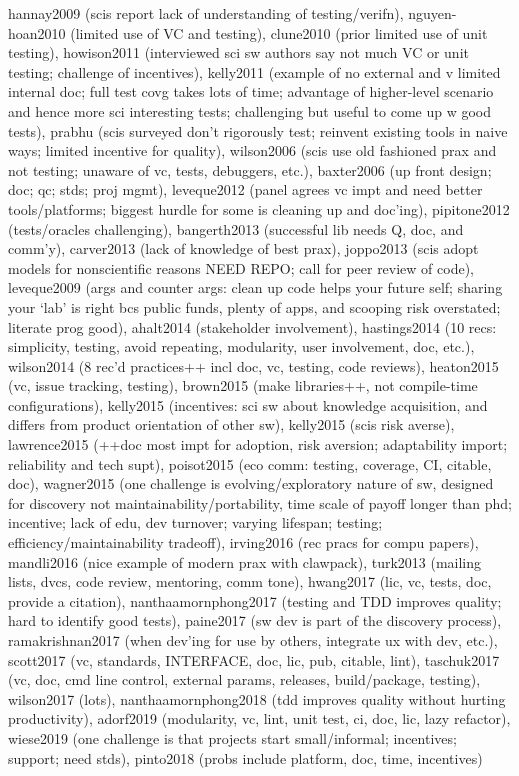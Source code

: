 \documentclass[12pt]{amsart}
\begin{document}
hannay2009 (scis report lack of understanding of testing/verifn), nguyen-hoan2010 (limited use of VC and testing), clune2010 (prior limited use of unit testing), howison2011 (interviewed sci sw authors say not much VC or unit testing; challenge of incentives), kelly2011 (example of no external and v limited internal doc; full test covg takes lots of time; advantage of higher-level scenario and hence more sci interesting tests; challenging but useful to come up w good tests), prabhu (scis surveyed don't rigorously test; reinvent existing tools in naive ways; limited incentive for quality), wilson2006 (scis use old fashioned prax and not testing; unaware of vc, tests, debuggers, etc.), baxter2006 (up front design; doc; qc; stds; proj mgmt), leveque2012 (panel agrees vc impt and need better tools/platforms; biggest hurdle for some is cleaning up and doc'ing), pipitone2012 (tests/oracles challenging), bangerth2013 (successful lib needs Q, doc, and comm'y), carver2013 (lack of knowledge of best prax), joppo2013 (scis adopt models for nonscientific reasons NEED REPO; call for peer review of code), leveque2009 (args and counter args: clean up code helps your future self; sharing your `lab' is right bcs public funds, plenty of apps, and scooping risk overstated; literate prog good), ahalt2014 (stakeholder involvement), hastings2014 (10 recs: simplicity, testing, avoid repeating, modularity, user involvement, doc, etc.), wilson2014 (8 rec'd practices++ incl doc, vc, testing, code reviews), heaton2015 (vc, issue tracking, testing), brown2015 (make libraries++, not compile-time configurations), kelly2015 (incentives: sci sw about knowledge acquisition, and differs from product orientation of other sw), kelly2015 (scis risk averse), lawrence2015 (++doc most impt for adoption, risk aversion; adaptability import; reliability and tech supt), poisot2015 (eco comm: testing, coverage, CI, citable, doc), wagner2015 (one challenge is evolving/exploratory nature of sw, designed for discovery not maintainability/portability, time scale of payoff longer than phd; incentive; lack of edu, dev turnover; varying lifespan; testing; efficiency/maintainability tradeoff), irving2016 (rec pracs for compu papers), mandli2016 (nice example of modern prax with clawpack), turk2013 (mailing lists, dvcs, code review, mentoring, comm tone), hwang2017 (lic, vc, tests, doc, provide a citation), nanthaamornphong2017 (testing and TDD improves quality; hard to identify good tests), paine2017 (sw dev is part of the discovery process), ramakrishnan2017 (when dev'ing for use by others, integrate ux with dev, etc.), scott2017 (vc, standards, INTERFACE, doc, lic, pub, citable, lint), taschuk2017 (vc, doc, cmd line control, external params, releases, build/package, testing), wilson2017 (lots), nanthaamornphong2018 (tdd improves quality without hurting productivity), adorf2019 (modularity, vc, lint, unit test, ci, doc, lic, lazy refactor), wiese2019 (one challenge is that projects start small/informal; incentives; support; need stds), pinto2018 (probs include platform, doc, time, incentives)
\end{document}
